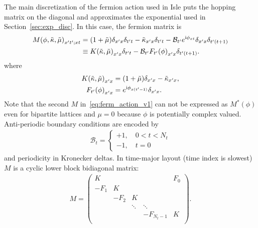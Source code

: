 \documentclass[a4paper, fleqn, twoside, notitlepage]{scrartcl}
\begin{document}
The main discretization of the fermion action used in Isle puts the hopping matrix on the diagonal and approximates the exponential used in Section~\ref{sec:exp_disc}.
In this case, the fermion matrix is
\begin{align}
  {M(\phi, \tilde{\kappa}, \tilde{\mu})}_{x't';xt}
  &= (1+\tilde{\mu})\delta_{x'x}\delta_{t't} - \tilde{\kappa}_{x'x}\delta_{t't} - \mathcal{B}_{t'} e^{\mathrm{i}\phi_{xt}}\delta_{x'x}\delta_{t'(t+1)}\label{eq:def_m}\\
  &\equiv {K(\tilde{\kappa}, \tilde{\mu})}_{x'x}\delta_{t't} - \mathcal{B}_{t'}{F_{t'}(\phi)}_{x'x}\delta_{t'(t+1)}.
\end{align}
where
\begin{align}
  {K(\tilde{\kappa}, \tilde{\mu})}_{x'x} &= (1+\tilde{\mu})\delta_{x'x} - \tilde{\kappa}_{x'x},\\
  {F_{t'}(\phi)}_{x'x} &= e^{\mathrm{i}\phi_{x(t'-1)}}\delta_{x'x}.
\end{align}
Note that the second $M$ in~\eqref{eq:ferm_action_v1} can not be expressed as $M^*(\phi)$ even for bipartite lattices and $\mu=0$ because $\phi$ is potentially complex valued.
Anti-periodic boundary conditions are encoded by
\begin{align}
  \mathcal{B}_t =
  \begin{cases}
    +1,\quad 0 < t < N_t\\
    -1,\quad t = 0
  \end{cases}
\end{align}
and periodicity in Kronecker deltas.
In time-major layout (time index is slowest) $M$ is a cyclic lower block bidiagonal matrix:
\begin{align}
  M =
  \begin{pmatrix}
    K    &      &        &        & F_0 \\
    -F_1 & K    &        &        &     \\
         & -F_2 & K      &        &     \\
         &      & \ddots & \ddots &     \\
         &      &        &-F_{N_t-1}&K   \\
  \end{pmatrix}.\label{eq:ferm_mat_block_v1}
\end{align}
\end{document}
